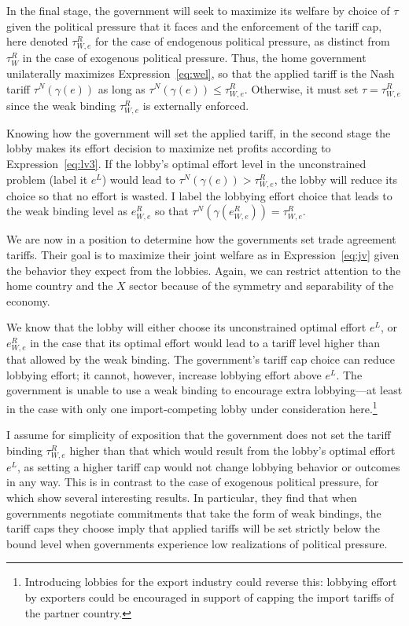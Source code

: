 \documentclass[12pt]{article}
\newcommand{\ga}{\gamma}
\begin{document}
In the final stage, the government will seek to maximize its welfare by choice of $\tau$ given the political pressure that it faces and the enforcement of the tariff cap, here denoted $\tau_{W,e}^R$ for the case of endogenous political pressure, as distinct from $\tau_W^R$ in the case of exogenous political pressure. Thus, the home government unilaterally maximizes Expression~\ref{eq:wel}, so that the applied tariff is the Nash tariff $\tau^N(\ga(e))$ as long as  $\tau^N(\ga(e)) \leq \tau_{W,e}^R$. Otherwise, it must set $\tau = \tau_{W,e}^R$ since the weak binding $\tau_{W,e}^R$ is externally enforced.

Knowing how the government will set the applied tariff, in the second stage the lobby makes its effort decision to maximize net profits according to Expression~\ref{eq:lv3}. If the lobby's optimal effort level in the unconstrained problem (label it $e^L$) would lead to $\tau^N(\ga(e)) > \tau_{W,e}^R$, the lobby will reduce its choice so that no effort is wasted. I label the lobbying effort choice that leads to the weak binding level as $e^R_{W,e}$ so that $\tau^N(\ga(e^R_{W,e})) = \tau_{W,e}^R$.

We are now in a position to determine how the governments set trade agreement tariffs. Their goal is to maximize their joint welfare as in Expression~\ref{eq:jv} given the behavior they expect from the lobbies. Again, we can restrict attention to the home country and the $X$ sector because of the symmetry and separability of the economy.

We know that the lobby will either choose its unconstrained optimal effort $e^L$, or $e^R_{W,e}$ in the case that its optimal effort would lead to a tariff level higher than that allowed by the weak binding. The government's tariff cap choice can reduce lobbying effort; it cannot, however, increase lobbying effort above $e^L$. The government is unable to use a weak binding to encourage extra lobbying---at least in the case with only one import-competing lobby under consideration here.\footnote{Introducing lobbies for the export industry could reverse this: lobbying effort by exporters could be encouraged in support of capping the import tariffs of the partner country.}

I assume for simplicity of exposition that the government does not set the tariff binding $\tau^R_{W,e}$ higher than that which would result from the lobby's optimal effort $e^L$, as setting a higher tariff cap would not change lobbying behavior or outcomes in any way. This is in contrast to the case of exogenous political pressure, for which \Textcite{bs2005} show several interesting results. In particular, they find that when governments negotiate commitments that take the form of weak bindings, the tariff caps they choose imply that applied tariffs will be set strictly below the bound level when governments experience low realizations of political pressure.
\end{document}
